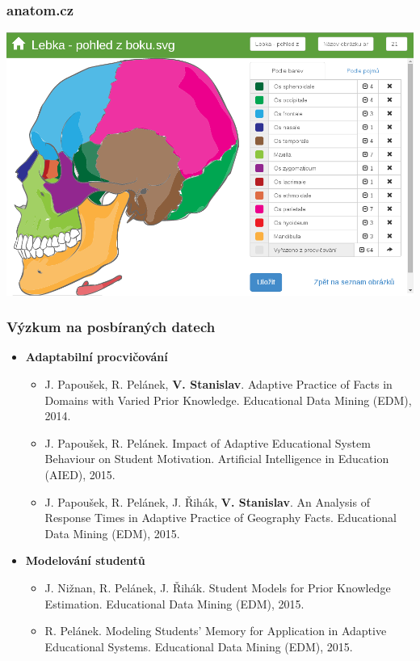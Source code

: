 \documentclass[xcolor=svgnames]{beamer}
\begin{document}
\begin{frame}
	\frametitle{anatom.cz}
	 
   \includegraphics[width=\textwidth]{img/anatomie.png}
\end{frame}
\begin{frame}
	\frametitle{Výzkum na posbíraných datech}

  \begin{itemize}
   \item \textbf{Adaptabilní procvičování}

  \begin{itemize}
   \item J. Papoušek, R. Pelánek, \textbf{V. Stanislav}. Adaptive Practice of Facts in Domains with Varied Prior Knowledge. Educational Data Mining (EDM), 2014.
   \item J. Papoušek, R. Pelánek. Impact of Adaptive Educational System Behaviour on Student Motivation. Artificial Intelligence in Education (AIED), 2015.
   \item J. Papoušek, R. Pelánek, J. Řihák, \textbf{V. Stanislav}. An Analysis of Response Times in Adaptive Practice of Geography Facts. Educational Data Mining (EDM), 2015.
  \end{itemize}

   \item \textbf{Modelování studentů }

  \begin{itemize}
   \item J. Nižnan, R. Pelánek, J. Řihák. Student Models for Prior Knowledge Estimation. Educational Data Mining (EDM), 2015.
   \item R. Pelánek. Modeling Students' Memory for Application in Adaptive Educational Systems. Educational Data Mining (EDM), 2015.
  \end{itemize}
  \end{itemize}

\end{frame}
\end{document}
